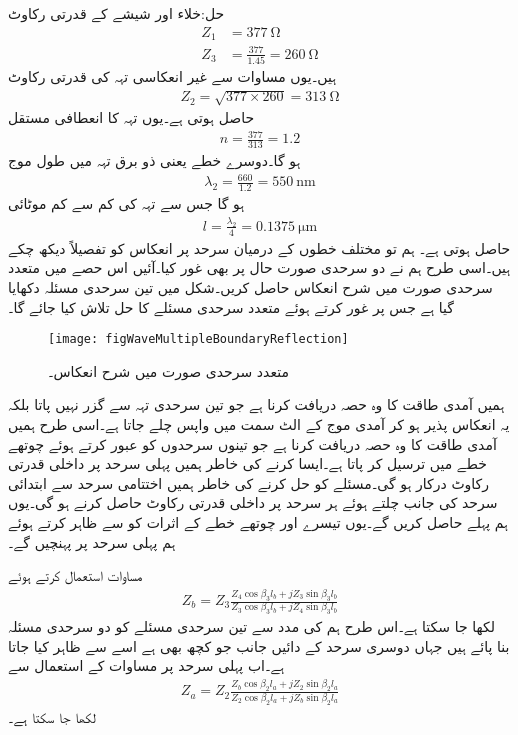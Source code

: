 حل:خلاء اور شیشے کے قدرتی رکاوٹ
\begin{align*}
Z_1&=\SI{377}{\ohm}\\
Z_3&=\frac{377}{1.45}=\SI{260}{\ohm}
\end{align*}
ہیں۔یوں مساوات  سے غیر انعکاسی تہہ کی قدرتی رکاوٹ
\begin{align*}
Z_2=\sqrt{377 \times 260}=\SI{313}{\ohm}
\end{align*}
حاصل ہوتی ہے۔یوں تہہ کا انعطافی مستقل
\begin{align*}
n=\frac{377}{313}=1.2
\end{align*}
ہو گا۔دوسرے خطے یعنی ذو برق تہہ میں طول موج
\begin{align*}
\lambda_2=\frac{660}{1.2}=\SI{550}{\nano\meter}
\end{align*}
ہو گا جس سے تہہ کی کم سے کم موٹائی
\begin{align*}
l=\frac{\lambda_2}{4}=\SI{0.1375}{\micro\meter}
\end{align*}
حاصل ہوتی ہے۔
ہم تو مختلف خطوں کے درمیان سرحد پر انعکاس کو تفصیلاً دیکھ چکے ہیں۔اسی طرح ہم نے دو سرحدی صورت حال پر بھی غور کیا۔آئیں اس حصے میں متعدد سرحدی صورت میں شرح انعکاس حاصل کریں۔شکل  میں تین سرحدی مسئلہ دکھایا گیا ہے جس پر غور کرتے ہوئے متعدد سرحدی مسئلے کا حل تلاش کیا جائے گا۔

\begin{figure}
\centering
\texttt{[image: figWaveMultipleBoundaryReflection]}
\caption{متعدد سرحدی صورت میں شرح انعکاس۔}
\label{شکل_مستوی_متعدد_سرحدی_شرح_انعکاس}
\end{figure}

ہمیں آمدی طاقت کا وہ حصہ دریافت کرنا ہے جو تین سرحدی تہہ سے گزر نہیں پاتا بلکہ یہ انعکاس پذیر ہو کر آمدی موج کے الٹ سمت میں واپس چلے جاتا ہے۔اسی طرح ہمیں آمدی طاقت کا وہ حصہ دریافت کرنا ہے جو تینوں سرحدوں کو عبور کرتے ہوئے چوتھے خطے میں ترسیل کر پاتا ہے۔ایسا کرنے کی خاطر ہمیں پہلی سرحد پر داخلی قدرتی رکاوٹ   درکار ہو گی۔مسئلے کو حل کرنے کی خاطر ہمیں اختتامی سرحد سے ابتدائی سرحد کی جانب چلتے ہوئے  ہر سرحد پر داخلی قدرتی رکاوٹ حاصل کرنے ہو گی۔یوں ہم پہلے  حاصل کریں گے۔یوں تیسرے اور چوتھے خطے کے اثرات کو  سے ظاہر کرتے ہوئے ہم پہلی سرحد پر پہنچیں گے۔

مساوات  استعمال کرتے ہوئے
\begin{align}
Z_{b}= Z_3 \frac{Z_4 \cos \beta_3 l_b +j Z_3 \sin \beta_3 l_b}{Z_3 \cos \beta_3 l_b +j Z_4\sin \beta_3 l_b}
\end{align}
لکھا جا سکتا ہے۔اس طرح ہم  کی مدد سے تین سرحدی مسئلے کو دو سرحدی مسئلہ بنا پائے ہیں جہاں دوسری سرحد کے دائیں جانب جو کچھ بھی ہے اسے  سے ظاہر کیا جاتا ہے۔اب پہلی سرحد پر مساوات  کے استعمال سے
 \begin{align}
Z_{a}= Z_2 \frac{Z_b \cos \beta_2 l_a +j Z_2 \sin \beta_2 l_a}{Z_2 \cos \beta_2 l_a +j Z_b\sin \beta_2 l_a}
\end{align}
لکھا جا سکتا ہے۔

